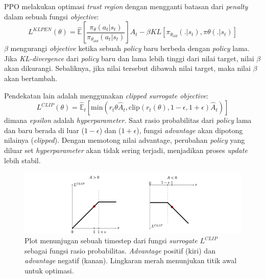 PPO melakukan optimasi \emph{trust region} dengan mengganti batasan dari \emph{penalty} dalam sebuah fungsi \emph{objective}:
\begin{equation}
  L^{KLPEN} (\theta) = \mathbb{\hat{E}}\left[\frac{\pi_{\theta} (a_{t} | s_{t})}{\pi_{\theta_{old}} (a_{t} | s_{t})}\right] \hat{A}_{t} - \beta KL \left[\pi_{\theta_{old}}(. | s_{t}), \pi \theta(. | s_{t})\right]
\end{equation}
$\beta$ mengurangi \emph{objective} ketika sebuah \emph{policy} baru berbeda dengan \emph{policy} lama.
Jika \emph{KL-divergence} dari \emph{policy} baru dan lama lebih tinggi dari nilai target,
nilai $\beta$ akan dikurangi. Sebaliknya, jika nilai tersebut dibawah nilai target, maka nilai $\beta$ akan bertambah.

Pendekatan lain adalah menggunakan \emph{clipped surrogate objective}:
\begin{equation}
  L^{CLIP} (\theta) = \mathbb{\hat{E}}_{t}\left[\text{min}(r_{t}{\theta}\hat{A}_{t},\text{clip}(r_{t}(\theta),1-\epsilon,1+\epsilon)\hat{A}_{t})\right]
\end{equation}
dimana \emph{epsilon} adalah \emph{hyperparameter}. 
Saat rasio probabilitas dari \emph{policy} lama dan baru berada di luar ($1-\epsilon$) dan ($1+\epsilon$),
fungsi \emph{advantage} akan dipotong nilainya (\emph{clipped}). 
Dengan memotong nilai advantage, perubahan \emph{policy} yang diluar set \emph{hyperparameter} akan tidak sering terjadi, 
menjadikan proses \emph{update} lebih stabil.

\begin{figure}[H]
  \centering
    \includegraphics[scale=0.6]{gambar/ppo_clipped.png}
    \caption{Plot menunjugan sebuah timestep dari fungsi \emph{surrogate} $L^{CLIP}$
    sebagai fungsi rasio probabilitas. \emph{Advantage} positif (kiri) dan \emph{advantage} negatif (kanan).
    Lingkaran merah menunjukan titik awal untuk optimasi.}
    \label{fig:ppoClippedPlot}
\end{figure}

